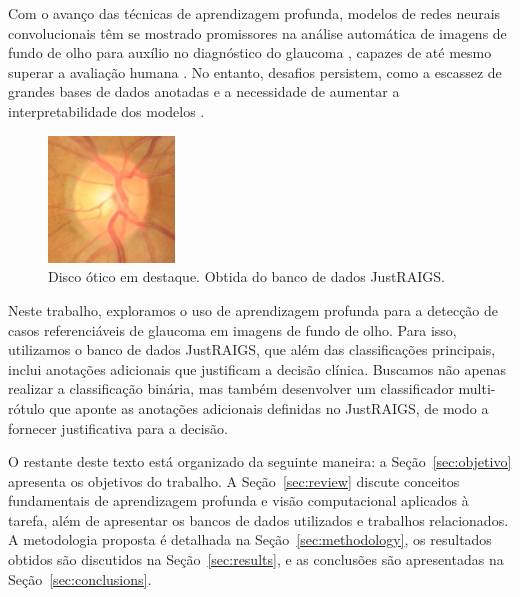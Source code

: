 \documentclass[12pt]{article}
\begin{document}
Com o avanço das técnicas de aprendizagem profunda, modelos de redes neurais convolucionais têm se mostrado promissores na análise automática de imagens de fundo de olho para auxílio no diagnóstico do glaucoma \cite{li_review_2021}, capazes de até mesmo superar a avaliação humana \cite{tan_glaucoma_2020}. No entanto, desafios persistem, como a escassez de grandes bases de dados anotadas e a necessidade de aumentar a interpretabilidade dos modelos \cite{li_review_2021}.

\begin{figure}[htb]
 \centering
 \includegraphics[width=0.3\textwidth]{images/disk.jpg}
 \caption{Disco ótico em destaque. Obtida do banco de dados JustRAIGS.}
 \label{fig:disk}
\end{figure}

Neste trabalho, exploramos o uso de aprendizagem profunda para a detecção de casos referenciáveis de glaucoma em imagens de fundo de olho. Para isso, utilizamos o banco de dados JustRAIGS, que além das classificações principais, inclui anotações adicionais que justificam a decisão clínica. Buscamos não apenas realizar a classificação binária, mas também desenvolver um classificador multi-rótulo que aponte as anotações adicionais definidas no JustRAIGS, de modo a fornecer justificativa para a decisão.

O restante deste texto está organizado da seguinte maneira: a Seção~\ref{sec:objetivo} apresenta os objetivos do trabalho. A Seção~\ref{sec:review} discute conceitos fundamentais de aprendizagem profunda e visão computacional aplicados à tarefa, além de apresentar os bancos de dados utilizados e trabalhos relacionados. A metodologia proposta é detalhada na Seção~\ref{sec:methodology}, os resultados obtidos são discutidos na Seção~\ref{sec:results}, e as conclusões são apresentadas na Seção~\ref{sec:conclusions}.
\end{document}

